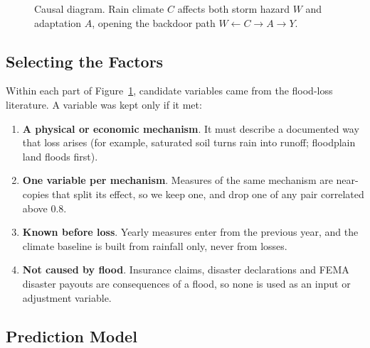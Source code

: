 \documentclass[10pt,twocolumn]{article}
\begin{document}
\begin{figure}[H]
\centering
{}
\caption{Causal diagram. Rain climate $C$ affects both storm hazard $W$ and
adaptation $A$, opening the backdoor path $W \leftarrow C \rightarrow A \rightarrow Y$.}
\label{fig:dag}
\end{figure}

\subsection{Selecting the Factors}
\label{sec:factors}
Within each part of Figure~\ref{fig:dag}, candidate variables came from the flood-loss literature. A variable was kept only if it met:
\begin{enumerate}
\item \textbf{A physical or economic mechanism}. It must describe a documented way that loss arises (for example, saturated soil turns rain into runoff; floodplain land floods first).
\item \textbf{One variable per mechanism}. Measures of the same mechanism are near-copies that split its effect, so we keep one, and drop one of any pair correlated above 0.8.
\item \textbf{Known before loss}. Yearly measures enter from the previous year, and the climate baseline is built from rainfall only, never from losses.
\item \textbf{Not caused by flood}. Insurance claims, disaster declarations and FEMA disaster payouts are consequences of a flood, so none is used as an input or adjustment variable.
\end{enumerate}

\subsection{Prediction Model}
\end{document}
